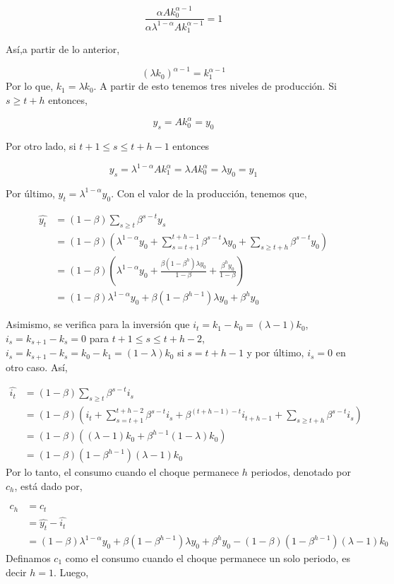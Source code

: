 \documentclass[]{article}
\begin{document}
\[
\frac{\alpha Ak_0^{\alpha-1}}{\alpha \lambda^{1-\alpha}Ak_1^{\alpha-1}} = 1
\]

Así,a partir de lo anterior,

\[
(\lambda k_0)^{\alpha-1} = k_1^{\alpha-1}
\] Por lo que, \(k_1 = \lambda k_0\). A partir de esto tenemos tres
niveles de producción. Si \(s \geq t+h\) entonces,

\[
y_s = Ak_0^{\alpha} = y_0
\]

Por otro lado, si \(t+1 \leq s \leq t+h-1\) entonces

\[
y_s = \lambda^{1-\alpha}Ak_1^\alpha = \lambda Ak_0^{\alpha} = \lambda y_0 = y_1
\]

Por último, \(y_t = \lambda^{1-\alpha}y_0\). Con el valor de la
producción, tenemos que,

\[
\begin{align}
\hat{y_t} &= (1-\beta)\sum_{s\geq t}\beta^{s-t} y_s \\
&=(1-\beta)\left(\lambda^{1-\alpha}y_0 + \sum_{s = t+1}^{t+h-1}\beta^{s-t}\lambda y_0 + \sum_{s\geq t+h}\beta^{s-t}y_0 \right) \\
&= (1-\beta)\left(\lambda^{1-\alpha}y_0 + \frac{\beta(1-\beta^{h})\lambda y_0}{1-\beta} + \frac{\beta^h y_0}{1-\beta} \right) \\
&= (1-\beta)\lambda^{1-\alpha}y_0 + \beta(1-\beta^{h-1})\lambda y_0 + \beta^h y_0
\end{align}
\]

Asimismo, se verifica para la inversión que
\(i_t = k_1 - k_0 = (\lambda-1)k_0\), \(i_s = k_{s+1} - k_s = 0\) para
\(t + 1 \leq s \leq t+h-2\),
\(i_s = k_{s+1}-k_s = k_0 - k_1 = (1-\lambda)k_0\) si \(s = t+h-1\) y
por último, \(i_s = 0\) en otro caso. Así,

\[
\begin{align}
\hat{i_t} &= (1-\beta) \sum_{s\geq t} \beta^{s-t} i_s \\
&= (1-\beta)\left(i_t + \sum_{s = t+1}^{t+h-2}\beta^{s-t} i_s + \beta^{(t+h-1)-t}i_{t+h-1} + \sum_{s \geq t+h} \beta^{s-t} i_s \right) \\
&= (1-\beta)((\lambda-1)k_0 + \beta^{h-1}(1-\lambda)k_0) \\
&= (1-\beta)(1-\beta^{h-1})(\lambda - 1)k_0
\end{align}
\] Por lo tanto, el consumo cuando el choque permanece \(h\) periodos,
denotado por \(c_h\), está dado por,

\[
\begin{align}
c_h &= c_t \\
& = \hat{y_t} - \hat{i_t} \\
&= (1-\beta)\lambda^{1-\alpha}y_0 + \beta(1-\beta^{h-1})\lambda y_0 + \beta^h y_0 - (1-\beta)(1-\beta^{h-1})(\lambda - 1)k_0 
\end{align}
\] Definamos \(c_1\) como el consumo cuando el choque permanece un solo
periodo, es decir \(h = 1\). Luego,
\end{document}
